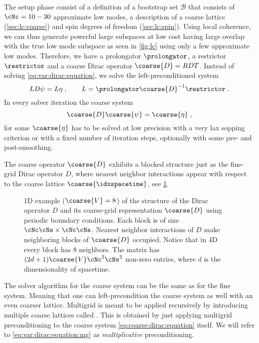 The setup phase consist of a definition of a bootstrap set $\mathcal{B}$ that consists of $\cNc = 10-30$ approximate low modes, a description of a coarse lattice (\cref{sec:lc:coarse}) and spin degrees of freedom (\cref{sec:lc:spin}).
Using local coherence, we can thus generate powerful large subspaces at low cost having large overlap with the true low mode subspace as seen in \cref{fig:lc} using only a few approximate low modes.
Therefore, we have a prolongator $\prolongator$, a restrictor $\restrictor$ and a coarse Dirac operator $\coarse{D} = RDT$.
Instead of solving \cref{eq:var:dirac:equation}, we solve the left-preconditioned system
\begin{equation} \label{eq:var:dirac:equation:mg}
L D \psi = L \eta \;,
\qquad
L = \prolongator \coarse{D}^{-1} \restrictor \;.
\end{equation}
In every solver iteration the coarse system
\begin{equation} \label{eq:coarse:dirac:equation}
\coarse{D} \coarse{\psi} = \coarse{\eta} \;,
\end{equation}
for some $\coarse{\eta}$ has to be solved at low precision with a very lax sopping criterion or with a fixed number of iteration steps, optionally with some pre- and post-smoothing.

The coarse operator $\coarse{D}$ exhibits a blocked structure just as the fine-grid Dirac operator $D$, where nearest neighbor interactions appear with respect to the coarse lattice $\coarse{\idxspacetime}$, see \cref{fig:coarse:op:structure}.
\begin{figure}
\centering

\caption{
1D example ($\coarse{V} = 8$) of the structure of the Dirac operator $D$ and its coarse-grid representation $\coarse{D}$ using periodic boundary conditions.
Each block is of size $\cNc \cNs \times \cNc \cNs$.
Nearest neighbor interactions of $D$ make neighboring blocks of $\coarse{D}$ occupied.
Notice that in 4D every block has \num{8} neighbors.
The matrix has $(2d+1)\coarse{V} \cNc^2 \cNs^2$ non-zero entries, where $d$ is the dimensionality of spacetime.
\takenfull
}
\label{fig:coarse:op:structure}
\end{figure}
The solver algorithm for the coarse system can be the same as for the fine system.
Meaning that one can left-precondition the coarse system as well with an even coarser lattice.
Multigrid is meant to be applied recursively by introducing multiple coarse lattices called .
This is obtained by just applying multigrid preconditioning to the coarse system \cref{eq:coarse:dirac:equation} itself.
We will refer to \cref{eq:var:dirac:equation:mg} as \emph{multiplicative} preconditioning.

